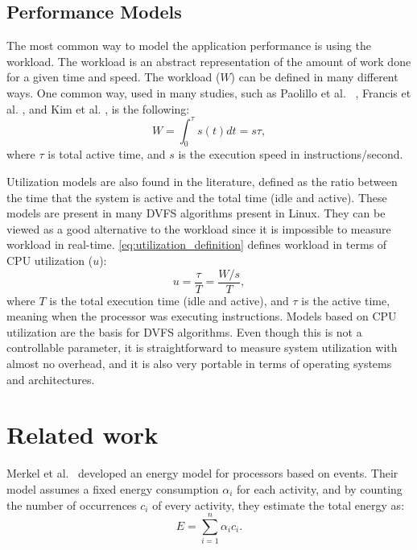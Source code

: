 \subsection{Performance Models}
The most common way to model the application performance is using the workload. The workload is an abstract representation of the amount of work done for a given time and speed. The workload ($W$) can be defined in many different ways. One common way, used in many studies, such as Paolillo et al. ~\cite{Paolillo2018OptimisationParallelism}, Francis et al. \cite{ Group2012HandbookSahni}, and Kim et al. \cite{Kim2015RacingHeuristics}, is the following:
\begin{equation}
	W = \int_{0}^{\tau}s(t)dt = s\tau,
	\label{eq:workload_definition}
\end{equation}
where $\tau$ is total active time, and $s$ is the execution speed in instructions/second.

Utilization models \cite{Fu2018RaceMinimization, Group2012HandbookSahni} are also found in the literature, defined as the ratio between the time that the system is active and the total time (idle and active). These models are present in many DVFS algorithms present in Linux. They can be viewed as a good alternative to the workload since it is impossible to measure workload in real-time.  \cref{eq:utilization_definition} defines workload in terms of CPU utilization ($u$):
\begin{equation}
	u = \frac{\tau}{T} = \frac{W/s}{T},
	\label{eq:utilization_definition}
\end{equation}
where $T$ is the total execution time (idle and active), and $\tau$ is the active time, meaning when the processor was executing instructions.
Models based on CPU utilization are the basis for DVFS algorithms. Even though this is not a controllable parameter, it is straightforward to measure system utilization with almost no overhead, and it is also very portable in terms of operating systems and architectures.

\section{Related work} \label{sec:related_work}

Merkel et al.~\cite{Merkel2006BalancingSystems} developed an energy model for processors based on events. Their model assumes a fixed energy consumption $\alpha_i$ for each activity, and by counting the number of occurrences $c_i$ of every activity, they estimate the total energy as:
\begin{equation}
	E = \sum_{i=1}^{n}\alpha_ic_i.
	\label{equation:rw_merkel}
\end{equation}


